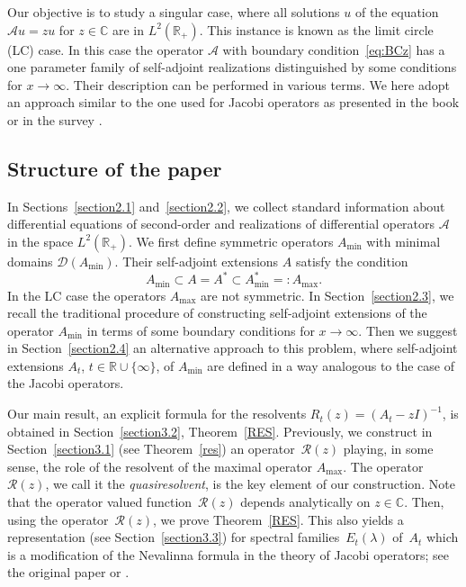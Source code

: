 \documentclass[pdftex]{sigma}%
\numberwithin{equation}{section}
\begin{document}
 Our objective is to study a singular case, where all solutions $u$ of the equation ${\mathcal A}u=z u $ for $z\in{\mathbb C}$ are in $L^2 ({\mathbb R}_{+})$. This instance is known as the limit circle (LC) case. In this case the operator ${\mathcal A}$ with boundary condition~\eqref{eq:BCz} has a one parameter family of self-adjoint realizations distinguished by some conditions for $x\to\infty$. Their description can be performed in various terms. We here adopt an approach similar to the one used for Jacobi operators as presented in the book \cite[Section~16.3]{Schm} or in the survey \cite[Section~2]{Simon}.

 \subsection{Structure of the paper}\label{section1.2}

 In Sections~\ref{section2.1} and~\ref{section2.2}, we collect standard information about differential equations of second-order and realizations of differential operators ${\mathcal A}$ in the space $L^2 ({\mathbb R}_{+})$. We first define symmetric operators $A_{\min}$ with minimal domains
 $\mathcal{D}(A_{\min})$. Their self-adjoint extensions $A$ satisfy the condition
 \begin{equation}
A_{\min}\subset A =A^*\subset A_{\min}^*=: A_{\max}.
 \label{eq:Neum3}\end{equation}
In the LC case the operators $A_{\max}$ are not symmetric. In Section~\ref{section2.3}, we recall the traditional procedure of constructing self-adjoint extensions of the operator $A_{\min}$ in terms of some boundary conditions for $x\to\infty$. Then we suggest in Section~\ref{section2.4} an alternative approach to this problem, where self-adjoint extensions $A_{t}$, $t\in {\mathbb R}\cup\{ \infty\}$, of $A_{\min}$ are defined in a way analogous to the case of the Jacobi operators.

Our main result, an explicit formula for the resolvents $R_t (z)= (A_t-zI)^{-1}$, is obtained in Section~\ref{section3.2}, Theorem~\ref{RES}. Previously, we construct in Section~\ref{section3.1} (see Theorem~\ref{res}) an operator~${\mathcal R}(z)$ playing, in some sense, the role of the resolvent of the maximal operator $A_{\max}$. The operator~${\mathcal R}(z)$, we call it the {\it quasiresolvent}, is the key element of our construction.
 Note that the operator valued function~${\mathcal R}(z)$ depends analytically on $z\in{\mathbb C}$. Then, using the operator~${\mathcal R}(z)$, we prove Theorem~\ref{RES}. This also yields a representation (see Section~\ref{section3.3}) for spectral families~$E_{t}(\lambda)$ of~$A_{t}$ which is a modification of the Nevalinna formula in the theory of Jacobi operators; see the original paper \cite{Nevan} or \cite{Schm, Simon}.
\end{document}
